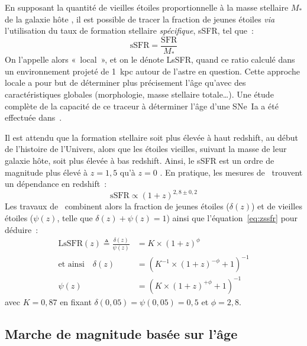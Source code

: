 \documentclass[../main/main.tex]{subfiles}
\begin{document}
En supposant la quantité de vieilles étoiles proportionnelle à la masse
stellaire $M_*$ de la galaxie hôte \citep{mannucci2005, scannapieco2005}, il est
possible de tracer la fraction de jeunes étoiles \textit{via} l'utilisation du
taux de formation stellaire \textit{spécifique}, sSFR, tel que~:
\begin{equation}\label{eq:ssfr}
    \mathrm{sSFR} = \frac{\mathrm{SFR}}{M_*}
\end{equation}
On l'appelle alors «~local~», et on le dénote LsSFR, quand ce ratio calculé dans
un environnement projeté de \SI{1}{kpc} autour de l'astre en question. Cette
approche locale a pour but de déterminer plus précisement l'âge qu'avec des
caractéristiques globales (morphologie, masse stellaire totale…). Une étude
complète de la capacité de ce traceur à déterminer l'âge d'une SNe~Ia a été
effectuée dans~\cite{briday2021, briday2022}.

Il est attendu que la formation stellaire soit plus élevée à haut redshift, au
début de l'histoire de l'Univers, alors que les étoiles vieilles, suivant la
masse de leur galaxie hôte, soit plus élevée à bas redshift. Ainsi, le sSFR est
un ordre de magnitude plus élevé à $z = 1,5$ qu'à $z = 0$ \citep[voir][pour une
étude complète]{madau2015}. En pratique, les mesures de~\cite{tasca2015}
trouvent un dépendance en redshift~:
\begin{equation}\label{eq:zssfr}
    \mathrm{sSFR} \propto (1+z)^{2,8 \pm 0,2}
\end{equation}
Les travaux de~\cite{rigault2020} combinent alors la fraction de jeunes étoiles
($\delta(z)$) et de vieilles étoiles ($\psi(z)$, telle que $\delta(z) + \psi(z)
= 1$) ainsi que l'équation~\ref{eq:zssfr} pour déduire~:
\begin{align}\label{eq:dpz}
    \mathrm{LsSFR}(z) \triangleq \frac{\delta(z)}{\psi(z)} &=
        K\times(1+z)^{\phi} \\\label{eq:deltaz}
    \text{et ainsi}\quad
    \delta(z) & = \left( K^{-1}\times(1+z)^{-\phi} +1 \right)^{-1}
    \\\label{eq:psiz}
    \psi(z)   & = \left( K\times(1+z)^{+\phi} +1 \right)^{-1}
\end{align}
avec $K=0,87$ en fixant $\delta(0,05) = \psi(0,05) = 0,5$ et $\phi = 2,8$.
\subsection{Marche de magnitude basée sur l'âge}\label{sssec:astep}

\newpage

\thispagestyle{plain}
\vfill
\minilof
\vfill
\minilot
\vfill

% 
% 
\end{document}
